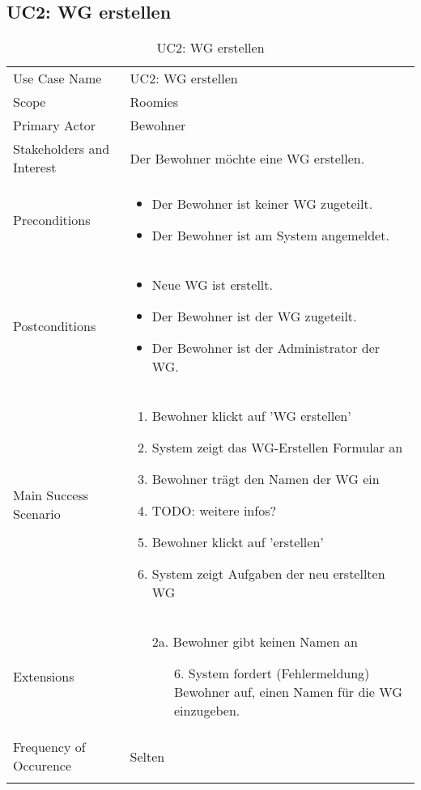 \subsection{UC2: WG erstellen}
\begin{table}[H]
	\tablestyle
	\tablealtcolored
	\begin{tabularx}{\textwidth}{lX}
		\tablebody
			Use Case Name &
			UC2: WG erstellen
			\tabularnewline
			Scope &
			Roomies
			\tabularnewline
			Primary Actor &
			Bewohner
			\tabularnewline
			Stakeholders and Interest &
			Der Bewohner möchte eine WG erstellen.
			\tabularnewline
			Preconditions &
			\begin{itemize}
				\item Der Bewohner ist keiner WG zugeteilt.
				\item Der Bewohner ist am System angemeldet.
			\end{itemize}
			\tabularnewline
			Postconditions &
			\begin{itemize}
				\item Neue WG ist erstellt.
				\item Der Bewohner ist der WG zugeteilt.
				\item Der Bewohner ist der Administrator der WG.
			\end{itemize}
			\tabularnewline
			Main Success Scenario &
			\begin{enumerate}
				\item Bewohner klickt auf 'WG erstellen'
				\item System zeigt das WG-Erstellen Formular an
				\item Bewohner trägt den Namen der WG ein
				\item TODO: weitere infos?
				\item Bewohner klickt auf 'erstellen'
				\item System zeigt Aufgaben der neu erstellten WG
			\end{enumerate}
			\tabularnewline
			Extensions &
			\begin{itemize}
				\item[2a.] Bewohner gibt keinen Namen an
				\begin{itemize}
					\item[6.] System fordert (Fehlermeldung) Bewohner auf, einen Namen für die WG einzugeben.
				\end{itemize}
			\end{itemize}
			\tabularnewline
			Frequency of Occurence &
			Selten
			\tabularnewline
		\tableend
	\end{tabularx}
	\caption{UC2: WG erstellen}
\end{table}


